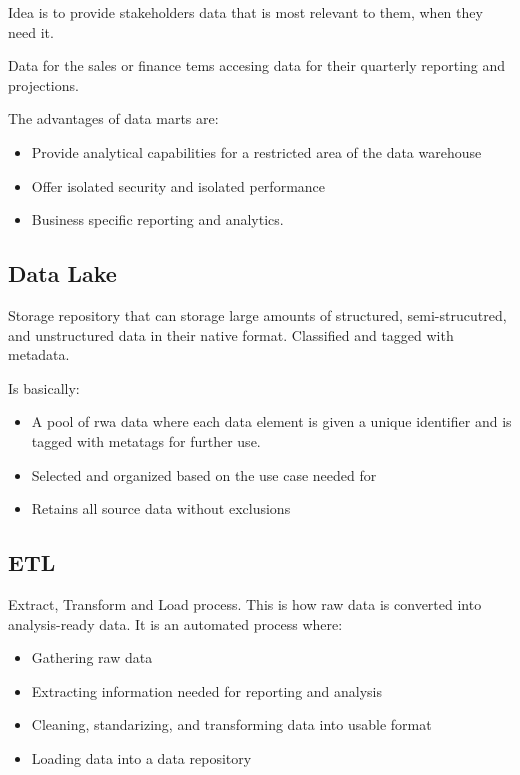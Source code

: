 \documentclass[../../ibm_data_analysis.tex]{subfiles}
\begin{document}
    Idea is to provide stakeholders data that is most relevant to them, when they need it.

    \begin{exa}
        Data for the sales or finance tems accesing data for their quarterly reporting and projections.
    \end{exa}

    The advantages of data marts are:
    \begin{itemize}
        \item Provide analytical capabilities for a restricted area of the data warehouse
        \item Offer isolated security and isolated performance
        \item Business specific reporting and analytics.
    \end{itemize}

    \subsection{Data Lake}

    \begin{mydef}[Nombre]
        Storage repository that can storage large amounts of structured, semi-strucutred, and unstructured data in their native format. Classified and tagged with metadata. 
    \end{mydef}

    Is basically:
    \begin{itemize}
        \item A pool of rwa data where each data element is given a unique identifier and is tagged with metatags for further use.
        \item Selected and organized based on the use case needed for
        \item Retains all source data without exclusions
    \end{itemize}

    \subsection{ETL}

    Extract, Transform and Load process. This is how raw data is converted into analysis-ready data. It is an automated process where:
    \begin{itemize}
        \item Gathering raw data
        \item Extracting information needed for reporting and analysis
        \item Cleaning, standarizing, and transforming data into usable format
        \item Loading data into a data repository
    \end{itemize}
\end{document}
